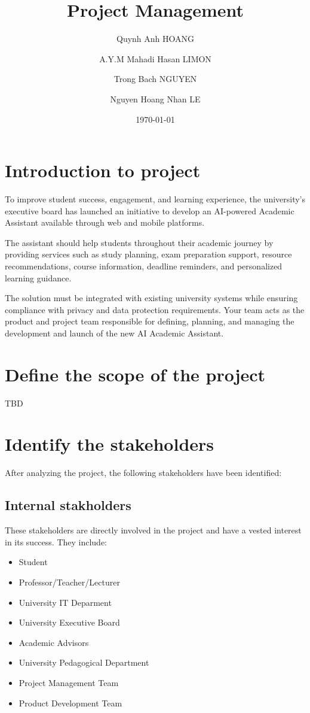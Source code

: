 \documentclass[12pt,a4paper]{article}
\title{Project Management}
\author{Quynh Anh HOANG \and A.Y.M Mahadi Hasan LIMON \and Trong Bach NGUYEN \and Nguyen Hoang Nhan LE}
\date{\today}
\begin{document}
\maketitle
\tableofcontents

\section{Introduction to project}

To improve student success, engagement, and learning experience, the university's
executive board has launched an initiative to develop an AI-powered Academic
Assistant available through web and mobile platforms.

The assistant should help students throughout their academic journey by providing
services such as study planning, exam preparation support, resource
recommendations, course information, deadline reminders, and personalized learning
guidance.

The solution must be integrated with existing university systems while
ensuring compliance with privacy and data protection requirements.
Your team acts as the product and project team responsible for defining, planning, and
managing the development and launch of the new AI Academic Assistant.

\section{Define the scope of the project}
TBD

\section{Identify the stakeholders}
After analyzing the project, the following stakeholders have been identified:
\subsection{Internal stakholders}
These stakeholders are directly involved in the project and have a vested interest in its success. They include:
\begin{itemize}
    \item Student
    \item Professor/Teacher/Lecturer
    \item University IT Deparment
    \item University Executive Board
    \item Academic Advisors
    \item University Pedagogical Department
    \item Project Management Team
    \item Product Development Team
\end{itemize}
\end{document}
